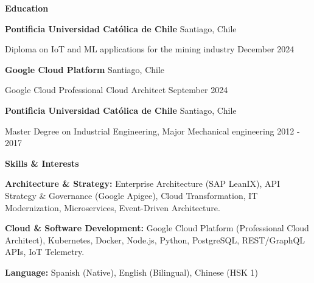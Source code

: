 \documentclass[11pt]{article}
\let\olditemize\itemize
\let\endolditemize\enditemize
\renewenvironment{itemize}[1][]{%
  \olditemize
  \setlength{\itemsep}{0pt}%
  \setlength{\parskip}{0pt}%
  \setlength{\parsep}{0pt}%
  \setlength{\partopsep}{0pt}%
}{%
  \endolditemize
}
\begin{document}
\newpage

\begin{center}
    \textbf{Education}
\end{center}

\textbf{Pontificia Universidad Católica de Chile} \hfill Santiago, Chile

Diploma on IoT and ML applications for the mining industry  \hfill December 2024

\vspace{6pt}

\textbf{Google Cloud Platform} \hfill Santiago, Chile

Google Cloud Professional Cloud Architect \hfill September 2024

\vspace{6pt}

\textbf{Pontificia Universidad Católica de Chile} \hfill Santiago, Chile

Master Degree on Industrial Engineering, Major Mechanical engineering \hfill 2012 - 2017





\begin{center}
    \textbf{Skills \& Interests}
\end{center}

\textbf{Architecture \& Strategy:} Enterprise Architecture (SAP LeanIX), API Strategy \& Governance (Google Apigee), Cloud Transformation, IT Modernization, Microservices, Event-Driven Architecture.

\textbf{Cloud \& Software Development:} Google Cloud Platform (Professional Cloud Architect), Kubernetes, Docker, Node.js, Python, PostgreSQL, REST/GraphQL APIs, IoT Telemetry.

\textbf{Language:} Spanish (Native), English (Bilingual), Chinese (HSK 1)
\end{document}
